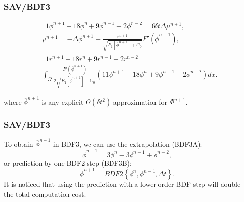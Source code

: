 \documentclass{beamer}
\begin{document}
    \begin{frame}
\frametitle{SAV/BDF3}
    
    \begin{equation}\label{SAV-BDF3}
  \begin{split}
&11\phi^{n+1}-18\phi^n+9\phi^{n-1}-2\phi^{n-2}=6\delta t\Delta\mu^{n+1},\\
&\mu^{n+1}=-\Delta\phi^{n+1}+\frac{r^{n+1}}{\sqrt{E_1[\overline{\phi}^{n+1}]+C_0}}F'(\overline{\phi}^{n+1}),\\
&11r^{n+1}-18r^n+9r^{n-1}-2r^{n-2}=\\
&\int_{\Omega}\frac{F'(\overline{\phi}^{n+1})}{2\sqrt{E_1[\overline{\phi}^{n+1}]+C_0}}(11\phi^{n+1}-18\phi^n+9\phi^{n-1}-2\phi^{n-2})dx.
  \end{split}
\end{equation}

where $\overline{\phi}^{n+1}$ is any explicit $O(\delta t^2)$ approximation for $\Phi^{n+1}$.
    \end{frame}
    
    \begin{frame}
\frametitle{SAV/BDF3}

    To obtain $\overline{\phi}^{n+1}$ in BDF3, we can use the extrapolation (BDF3A):
    $$
    \overline{\phi}^{n+1}=3\phi^n-3\phi^{n-1}+\phi^{n-2},
    $$
    or prediction by one BDF2 step (BDF3B):
    $$
    \overline{\phi}^{n+1}=BDF2\left\{\phi^n,\phi^{n-1},\Delta t\right\}.
    $$
    It is noticed that using the prediction with a lower order BDF step will double the total
computation cost.
    \end{frame}
\end{document}
